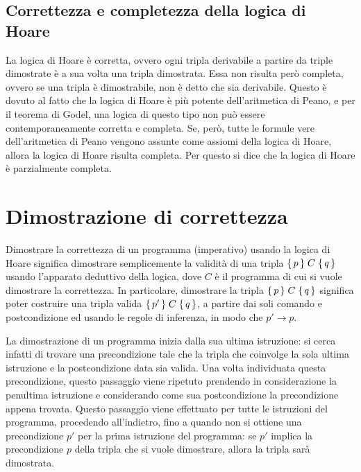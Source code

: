 \subsection*{Correttezza e completezza della logica di Hoare}
La logica di Hoare è corretta, ovvero ogni tripla derivabile a partire
da triple dimostrate è a sua volta una tripla dimostrata.
Essa non risulta però completa, ovvero se una tripla è dimostrabile, non
è detto che sia derivabile. Questo è dovuto al fatto che la logica di Hoare
è più potente dell'aritmetica di Peano, e per il teorema di Godel, una logica
di questo tipo non può essere contemporaneamente corretta e completa.
Se, però, tutte le formule vere dell'aritmetica di Peano vengono assunte
come assiomi della logica di Hoare, allora la logica di Hoare risulta
completa. Per questo si dice che la logica di Hoare è parzialmente completa.

\section{Dimostrazione di correttezza}
Dimostrare la correttezza di un programma (imperativo) usando la logica di
Hoare significa dimostrare semplicemente la validità di una tripla
$\Hoaretriple{p}{C}{q}$ usando l'apparato deduttivo della logica, dove
$C$ è il programma di cui si vuole dimostrare la correttezza.
In particolare, dimostrare la tripla $\Hoaretriple{p}{C}{q}$ significa
poter costruire una tripla valida $\Hoaretriple{p'}{C}{q}$, a partire dai soli comando e postcondizione ed usando
le regole di inferenza, in modo che $p' \rightarrow p$.

La dimostrazione di un programma inizia dalla sua ultima istruzione:
si cerca infatti di trovare una precondizione tale che la tripla
che coinvolge la sola ultima istruzione e la postcondizione data sia valida.
Una volta individuata questa precondizione, questo passaggio viene ripetuto
prendendo in considerazione la penultima istruzione e considerando come
sua postcondizione la precondizione appena trovata.
Questo passaggio viene effettuato per tutte le istruzioni del programma,
procedendo all'indietro, fino a quando non si ottiene una precondizione $p'$
per la prima istruzione del programma: se $p'$ implica la precondizione $p$
della tripla che si vuole dimostrare, allora la tripla sarà dimostrata.

